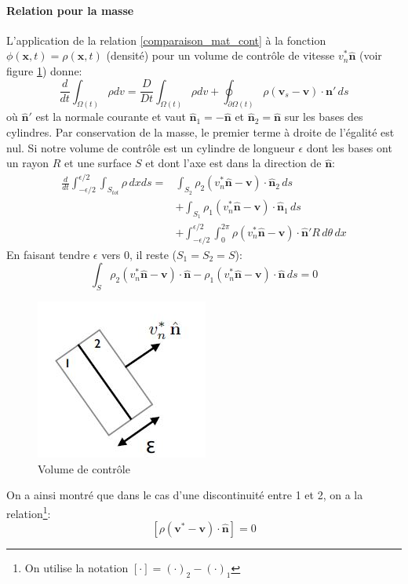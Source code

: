 \paragraph{Relation pour la masse}
L'application de la relation \ref{comparaison_mat_cont} à la fonction $\phi(\textbf{x},t)=\rho(\textbf{x},t)$ (densité) pour un volume de contrôle de vitesse $v^*_n\hat{\textbf{n}}$ (voir figure \ref{fig:disc_vol_cont}) donne:
$$\frac{d}{dt}\int_{\Omega (t)}\rho dv=\frac{D}{Dt}\int_{\Omega (t)}\rho dv+\oint_{\partial \Omega (t)}\rho(\textbf{v}_s-\textbf{v})\cdot \textbf{\^n}'\,ds$$
où $\hat{\textbf{n}}'$ est la normale courante et vaut $\hat{\textbf{n}}_1=-\hat{\textbf{n}}$ et $\hat{\textbf{n}}_2=\hat{\textbf{n}}$ sur les bases des cylindres.
Par conservation de la masse, le premier terme à droite de l'égalité est nul. Si notre volume de contrôle est un cylindre de longueur $\epsilon$ dont les bases ont un rayon $R$ et une surface $S$ et dont l'axe est dans la direction de $\hat{\textbf{n}}$:
\begin{align*}
\frac{d}{dt}\int_{-\epsilon/2}^{\epsilon/2}\int_{S_{tot}} \rho\,dxds=&\int_{S_2}\rho_2(v_n^*\hat{\textbf{n}}-\textbf{v})\cdot\hat{\textbf{n}}_2\,ds\\
 &+\int_{S_1}\rho_1(v_n^*\hat{\textbf{n}}-\textbf{v})\cdot\hat{\textbf{n}}_1\,ds\\
 &+\int_{-\epsilon/2}^{\epsilon/2}\int_0^{2\pi}\rho(v_n^*\hat{\textbf{n}}-\textbf{v})\cdot\hat{\textbf{n}}'R\,d\theta \,dx
\end{align*}
En faisant tendre $\epsilon$ vers 0, il reste ($S_1=S_2=S$):
$$\int_{S}\rho_2(v_n^*\hat{\textbf{n}}-\textbf{v})\cdot\hat{\textbf{n}}-\rho_1(v_n^*\hat{\textbf{n}}-\textbf{v})\cdot\hat{\textbf{n}}\,ds=0$$
\begin{figure}[!h]
\centering
\includegraphics[scale=0.6]{./discontinuite_vol_controle.jpg}
\caption{Volume de contrôle}
\label{fig:disc_vol_cont}
\end{figure}
On a ainsi montré que dans le cas d'une discontinuité entre 1 et 2, on a la relation\footnote{On utilise la notation $[\cdot]=(\cdot)_2-(\cdot)_1$}:
$$\boxed{[\rho(\textbf{v}^*-\textbf{v})\cdot\hat{\textbf{n}}]=0}$$
